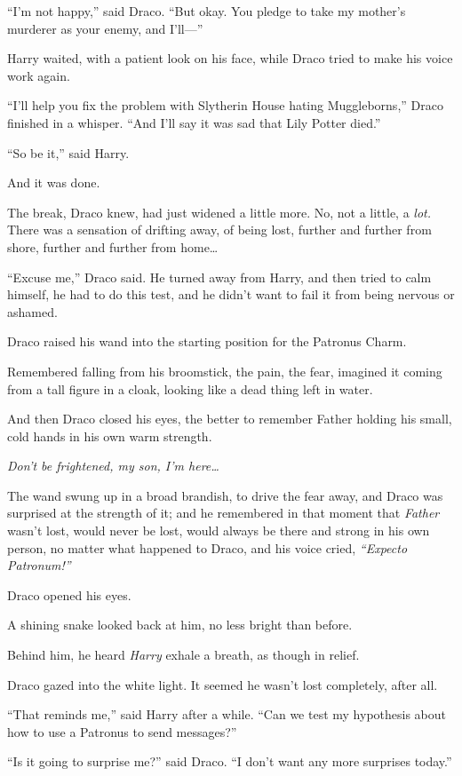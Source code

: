 ``I'm not happy,'' said Draco. ``But okay. You pledge to take my
mother's murderer as your enemy, and I'll---''

Harry waited, with a patient look on his face, while Draco tried to make
his voice work again.

``I'll help you fix the problem with Slytherin House hating
Muggleborns,'' Draco finished in a whisper. ``And I'll say it was sad
that Lily Potter died.''

``So be it,'' said Harry.

And it was done.

The break, Draco knew, had just widened a little more. No, not a little,
a \emph{lot.} There was a sensation of drifting away, of being lost,
further and further from shore, further and further from home\ldots{}

``Excuse me,'' Draco said. He turned away from Harry, and then tried to
calm himself, he had to do this test, and he didn't want to fail it from
being nervous or ashamed.

Draco raised his wand into the starting position for the Patronus Charm.

Remembered falling from his broomstick, the pain, the fear, imagined it
coming from a tall figure in a cloak, looking like a dead thing left in
water.

And then Draco closed his eyes, the better to remember Father holding
his small, cold hands in his own warm strength.

\emph{Don't be frightened, my son, I'm here\ldots{}}

The wand swung up in a broad brandish, to drive the fear away, and Draco
was surprised at the strength of it; and he remembered in that moment
that \emph{Father} wasn't lost, would never be lost, would always be
there and strong in his own person, no matter what happened to Draco,
and his voice cried, \emph{``Expecto Patronum!''}

Draco opened his eyes.

A shining snake looked back at him, no less bright than before.

Behind him, he heard \emph{Harry} exhale a breath, as though in relief.

Draco gazed into the white light. It seemed he wasn't lost completely,
after all.

``That reminds me,'' said Harry after a while. ``Can we test my
hypothesis about how to use a Patronus to send messages?''

``Is it going to surprise me?'' said Draco. ``I don't want any more
surprises today.''

